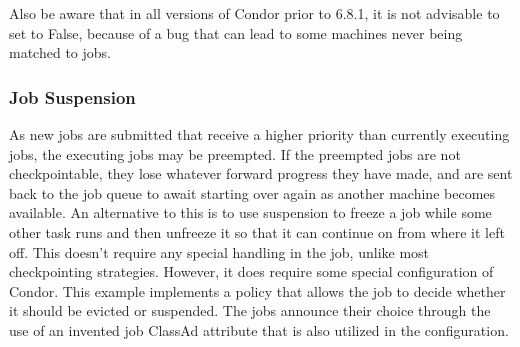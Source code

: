 Also be aware that in all versions of Condor prior to 6.8.1, it is
not advisable to set  to False,
because of a bug that can lead to some machines never being
matched to jobs.

\subsubsection{\label{sec:Job-Suspension}Job Suspension}
As new jobs are submitted that receive a higher priority than
currently executing jobs,
the executing jobs may be preempted.
If the preempted jobs are not checkpointable, they lose whatever forward
progress they have made,
and are sent back to the job queue to await starting over again as
another machine becomes available.
An alternative to this is to use suspension to freeze a job while some
other task runs and then unfreeze it so that it can continue on from
where it left off.  This doesn't require any special handling in the job,
unlike most checkpointing strategies.  However, it does require some
special configuration of Condor.
This example implements a policy that allows the job to decide
whether it should be evicted or suspended.
The jobs announce their choice through the use of an invented
job ClassAd attribute  that is also utilized in the
configuration.

